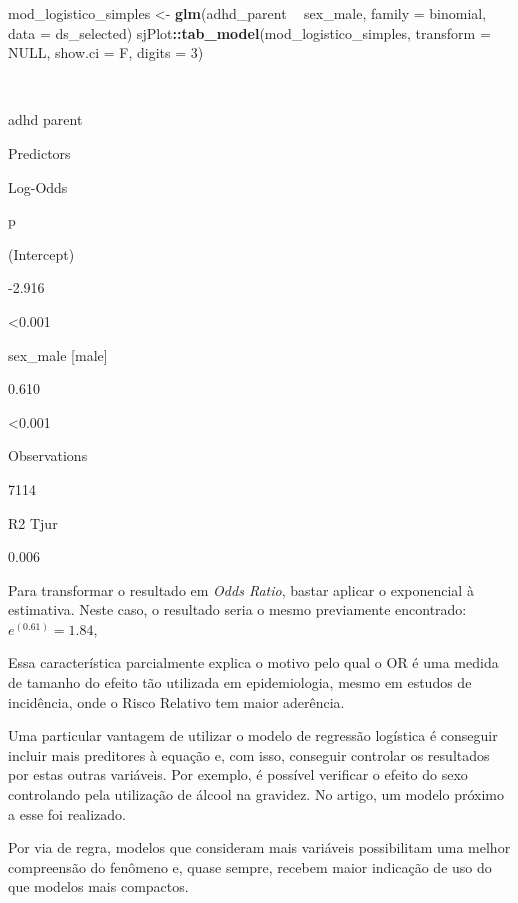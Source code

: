 \documentclass[
]{book}
\newenvironment{Shaded}{\begin{snugshade}}{\end{snugshade}}
\newcommand{\DataTypeTok}[1]{\textcolor[rgb]{0.13,0.29,0.53}{#1}}
\newcommand{\DecValTok}[1]{\textcolor[rgb]{0.00,0.00,0.81}{#1}}
\newcommand{\KeywordTok}[1]{\textcolor[rgb]{0.13,0.29,0.53}{\textbf{#1}}}
\newcommand{\NormalTok}[1]{#1}
\newcommand{\OperatorTok}[1]{\textcolor[rgb]{0.81,0.36,0.00}{\textbf{#1}}}
\newcommand{\OtherTok}[1]{\textcolor[rgb]{0.56,0.35,0.01}{#1}}
\newcommand{\StringTok}[1]{\textcolor[rgb]{0.31,0.60,0.02}{#1}}
\begin{document}
\begin{Shaded}
\begin{Highlighting}[]
\NormalTok{mod_logistico_simples <-}\StringTok{ }\KeywordTok{glm}\NormalTok{(adhd_parent }\OperatorTok{~}\StringTok{ }\NormalTok{sex_male,}
                             \DataTypeTok{family =}\NormalTok{ binomial, }
                             \DataTypeTok{data =}\NormalTok{ ds_selected)}
\NormalTok{sjPlot}\OperatorTok{::}\KeywordTok{tab_model}\NormalTok{(mod_logistico_simples,}
                  \DataTypeTok{transform =} \OtherTok{NULL}\NormalTok{, }
                  \DataTypeTok{show.ci =}\NormalTok{ F, }
                  \DataTypeTok{digits =} \DecValTok{3}\NormalTok{)}
\end{Highlighting}
\end{Shaded}

~

adhd parent

Predictors

Log-Odds

p

(Intercept)

-2.916

\textless0.001

sex\_male {[}male{]}

0.610

\textless0.001

Observations

7114

R2 Tjur

0.006

Para transformar o resultado em \emph{Odds Ratio}, bastar aplicar o exponencial à estimativa. Neste caso, o resultado seria o mesmo previamente encontrado: \(e^{(0.61)} = 1.84\),

Essa característica parcialmente explica o motivo pelo qual o OR é uma medida de tamanho do efeito tão utilizada em epidemiologia, mesmo em estudos de incidência, onde o Risco Relativo tem maior aderência.

Uma particular vantagem de utilizar o modelo de regressão logística é conseguir incluir mais preditores à equação e, com isso, conseguir controlar os resultados por estas outras variáveis. Por exemplo, é possível verificar o efeito do sexo controlando pela utilização de álcool na gravidez. No artigo, um modelo próximo a esse foi realizado.

Por via de regra, modelos que consideram mais variáveis possibilitam uma melhor compreensão do fenômeno e, quase sempre, recebem maior indicação de uso do que modelos mais compactos.
\end{document}
